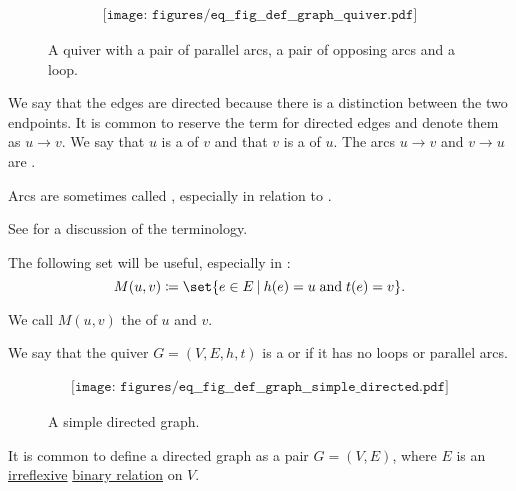 \begin{definition}
\begin{thmenum}[series=def:graph]
    \begin{figure}[h]
      \begin{equation}\label{eq:fig:def:graph/quiver}
        \begin{aligned}
          \texttt{[image: figures/eq\_\_fig\_\_def\_\_graph\_\_quiver.pdf]}
        \end{aligned}
      \end{equation}
      \caption{A quiver with a pair of parallel arcs, a pair of opposing arcs and a loop.}\label{fig:def:graph/quiver}
    \end{figure}

    We say that the edges are directed because there is a distinction between the two endpoints. It is common to reserve the term  for directed edges and denote them as \( u \to v \). We say that \( u \) is a  of \( v \) and that \( v \) is a  of \( u \). The arcs \( u \to v \) and \( v \to u \) are .

    Arcs are sometimes called , especially in relation to .

    See  for a discussion of the terminology.

    The following set will be useful, especially in :
    \begin{equation}\label{eq:def:graph/quiver/arc_set}
      M(u, v) \coloneqq \set{ e \in E \given h(e) = u \T{and} t(e) = v }.
    \end{equation}

    We call \( M(u, v) \) the  of \( u \) and \( v \).

     We say that the quiver \( G = (V, E, h, t) \) is a  or  if it has no loops or parallel arcs.

    \begin{figure}[h]
      \begin{equation}\label{eq:fig:def:graph/simple_directed}
        \begin{aligned}
          \texttt{[image: figures/eq\_\_fig\_\_def\_\_graph\_\_simple\_directed.pdf]}
        \end{aligned}
      \end{equation}
      \caption{A simple directed graph.}\label{fig:def:graph/simple_directed}
    \end{figure}

    It is common to define a directed graph as a pair \( G = (V, E) \), where \( E \) is an \hyperref[def:binary_relation/irreflexive]{irreflexive} \hyperref[def:binary_relation]{binary relation} on \( V \).


\end{thmenum}
\end{definition}

